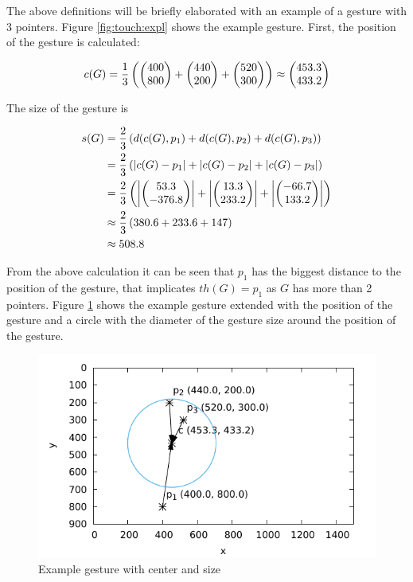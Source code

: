 The above definitions will be briefly elaborated with an example of a gesture with 3 pointers. Figure \ref{fig:touch:expl} shows the example gesture. First, the position of the gesture is calculated:

\begin{equation*}
c(G) = \frac{1}{3}\left( \left( \begin{matrix} 400 \\ 800 \end{matrix} \right) + \left( \begin{matrix} 440 \\ 200 \end{matrix} \right) + \left( \begin{matrix} 520 \\ 300 \end{matrix} \right) \right) \approx \left( \begin{matrix} 453.3 \\ 433.2 \end{matrix} \right)
\end{equation*}

The size of the gesture is

\begin{align*}
s(G) &= \frac{2}{3}\left( d(c(G), p_1) + d(c(G), p_2) + d(c(G), p_3) \right) \\
&= \frac{2}{3}\left( \left|c(G) - p_1\right| + \left| c(G) - p_2 \right| + \left| c(G) - p_3 \right| \right) \\
&= \frac{2}{3}\left( \left| \left( \begin{matrix} 53.3 \\ -376.8 \end{matrix} \right) \right| + \left| \left( \begin{matrix} 13.3 \\ 233.2 \end{matrix} \right) \right| + \left| \left( \begin{matrix} -66.7 \\ 133.2 \end{matrix} \right) \right| \right)	\\
&\approx \frac{2}{3}\left( 380.6 + 233.6 + 147 \right)\\
&\approx 508.8
\end{align*}

From the above calculation it can be seen that $p_1$ has the biggest distance to the position of the gesture, that implicates $th(G) = p_1$ as $G$ has more than 2 pointers. Figure \ref{fig:touch:expl_res} shows the example gesture extended with the position of the gesture and a circle with the diameter of the gesture size around the position of the gesture.

\begin{figure}
	\caption{\label{fig:touch:expl_res}Example gesture with center and size}
	\includegraphics{assets/chpt_concepts/gestures/3pointers_center.pdf}
\end{figure}

